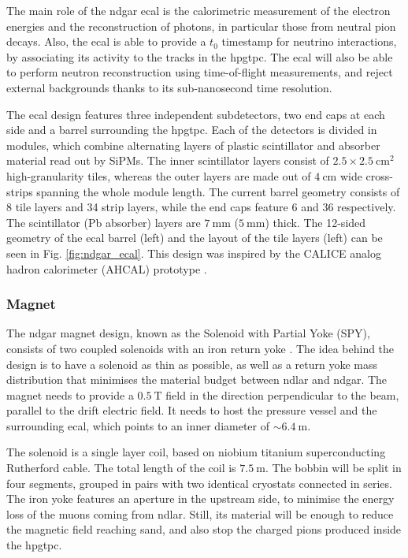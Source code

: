 The main role of the \gls{ndgar} \gls{ecal} is the calorimetric measurement of the electron energies and the reconstruction of photons, in particular those from neutral pion decays. Also, the \gls{ecal} is able to provide a $t_{0}$ timestamp for neutrino interactions, by associating its activity to the tracks in the \gls{hpgtpc}. The \gls{ecal} will also be able to perform neutron reconstruction using time-of-flight measurements, and reject external backgrounds thanks to its sub-nanosecond time resolution.

The \gls{ecal} design features three independent subdetectors, two end caps at each side and a barrel surrounding the \gls{hpgtpc}. Each of the detectors is divided in modules, which combine alternating layers of plastic scintillator and absorber material read out by SiPMs. The inner scintillator layers consist of $2.5\times2.5~\mathrm{cm}^{2}$ high-granularity tiles, whereas the outer layers are made out of $4~\mathrm{cm}$ wide cross-strips spanning the whole module length. The current barrel geometry consists of 8 tile layers and 34 strip layers, while the end caps feature 6 and 36 respectively. The scintillator (Pb absorber) layers are $7~\mathrm{mm}$ ($5~\mathrm{mm}$) thick. The 12-sided geometry of the \gls{ecal} barrel (left) and the layout of the tile layers (left) can be seen in Fig. \ref{fig:ndgar_ecal}. This design was inspired by the CALICE analog hadron calorimeter (AHCAL) prototype \cite{CALICE2010}.

\subsubsection{Magnet}

The \gls{ndgar} magnet design, known as the Solenoid with Partial Yoke (SPY), consists of two coupled solenoids with an iron return yoke \cite{DUNESPY2023}. The idea behind the design is to have a solenoid as thin as possible, as well as a return yoke mass distribution that minimises the material budget between \gls{ndlar} and \gls{ndgar}. The magnet needs to provide a $0.5~\mathrm{T}$ field in the direction perpendicular to the beam, parallel to the drift electric field. It needs to host the pressure vessel and the surrounding \gls{ecal}, which points to an inner diameter of $\sim6.4~\mathrm{m}$.

The solenoid is a single layer coil, based on niobium titanium superconducting Rutherford cable. The total length of the coil is $7.5~\mathrm{m}$. The bobbin will be split in four segments, grouped in pairs with two identical cryostats connected in series. The iron yoke features an aperture in the upstream side, to minimise the energy loss of the muons coming from \gls{ndlar}. Still, its material will be enough to reduce the magnetic field reaching \gls{sand}, and also stop the charged pions produced inside the \gls{hpgtpc}.

